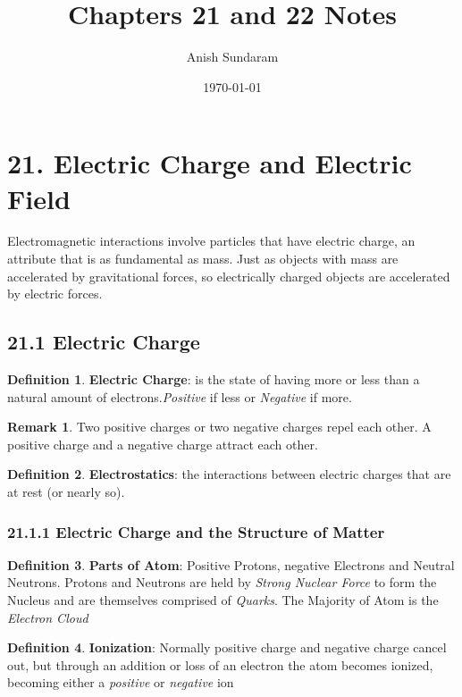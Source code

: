 \documentclass[12pt]{amsart}
\title{Chapters 21 and 22 Notes}
\author{Anish Sundaram}
\date{\today}
\theoremstyle{definition}
\newtheorem{definition}{Definition} %
\newtheorem*{remark}{Remark}        %
\numberwithin{equation}{theorem}    %
\begin{document}
\maketitle

\tableofcontents

\section*{21. Electric Charge and Electric Field}
Electromagnetic interactions involve particles that have electric charge, 
an attribute that is as fundamental as mass. Just as objects with mass are 
accelerated by gravitational forces, so electrically charged objects are 
accelerated by electric forces.


\subsection*{21.1 Electric Charge}
\begin{definition}
    \textbf{Electric Charge}: 
    is the state of having more or less than a natural
    amount of electrons.\textit{Positive} if less or \textit{Negative} if more. 
    \begin{remark}
        Two positive charges or two negative charges repel each other. A 
        positive charge and a negative charge attract each other.
    \end{remark}
\end{definition}

\begin{definition}
    \textbf{Electrostatics}: 
    the interactions between electric charges that are 
    at rest (or nearly so).
\end{definition}

\subsubsection*{21.1.1 Electric Charge and the Structure of Matter}

\begin{definition}
    \textbf{Parts of Atom}: 
    Positive Protons, negative Electrons and Neutral 
    Neutrons. Protons and Neutrons are held by \textit{Strong Nuclear Force} 
    to form the Nucleus and are themselves comprised of \textit{Quarks}. 
    The Majority of Atom is the \textit{Electron Cloud}
\end{definition}

\begin{definition}
    \textbf{Ionization}: 
    Normally positive charge and negative charge cancel 
    out, but through an addition or loss of an electron the atom becomes 
    ionized, becoming either a \textit{positive} or \textit{negative} ion 
\end{definition}
\end{document}
